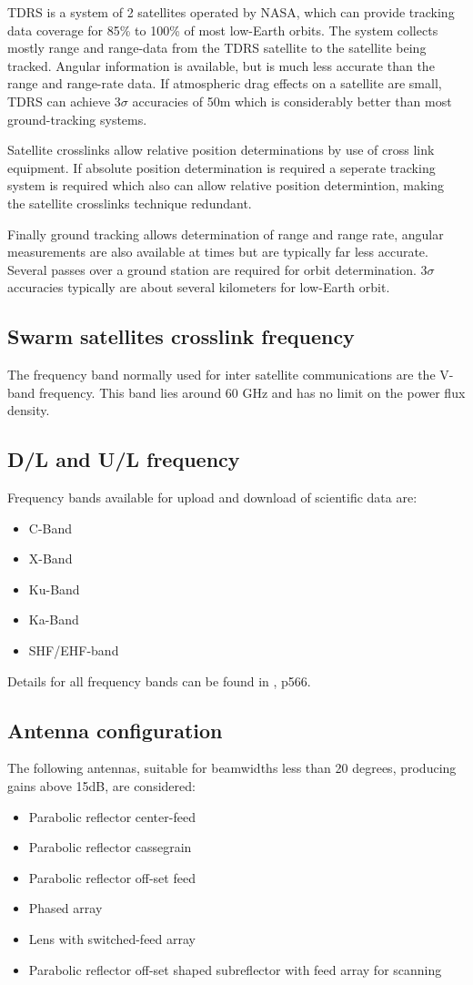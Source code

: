 TDRS is a system of 2 satellites operated by NASA, which can provide tracking data coverage for 85\% to 100\% of most low-Earth orbits. The system collects mostly range and range-data from the TDRS satellite to the satellite being tracked. Angular information is available, but is much less accurate than the range and range-rate data. If atmospheric drag effects on a satellite are small, TDRS can achieve 3$\sigma$ accuracies of 50m which is considerably better than most ground-tracking systems.

Satellite crosslinks allow relative position determinations by use of cross link equipment. If absolute position determination is required a seperate tracking system is required which also can allow relative position determintion, making the satellite crosslinks technique redundant.

Finally ground tracking allows determination of range and range rate, angular measurements are also available at times but are typically far less accurate. Several passes over a ground station are required for orbit determination. 3$\sigma$ accuracies typically are about several kilometers for low-Earth orbit.

\subsection{Swarm satellites crosslink frequency}
The frequency band normally used for inter satellite communications are the V-band frequency. This band lies around 60 GHz and has no limit on the power flux density.

\subsection{D/L and U/L frequency}
Frequency bands available for upload and download of scientific data are:
\begin{itemize}
\item C-Band
\item X-Band
\item Ku-Band
\item Ka-Band
\item SHF/EHF-band
\end{itemize}

Details for all frequency bands can be found in \cite{Larson}, p566.

\subsection{Antenna configuration}
The following antennas, suitable for beamwidths less than 20 degrees, producing gains above 15dB, are considered:
\begin{itemize}
\item Parabolic reflector center-feed
\item Parabolic reflector cassegrain
\item Parabolic reflector off-set feed
\item Phased array
\item Lens with switched-feed array
\item Parabolic reflector off-set shaped subreflector with feed array for scanning
\end{itemize}

